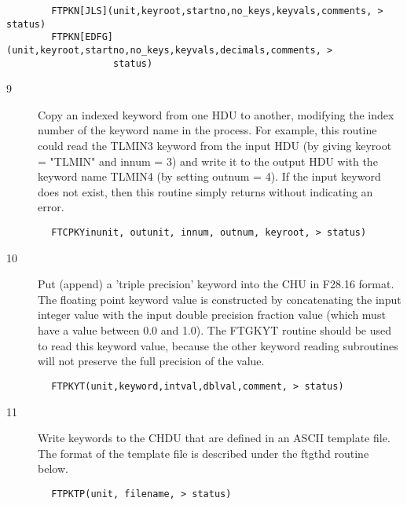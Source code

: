 \documentclass[11pt]{book}
\begin{document}
\begin{verbatim}
        FTPKN[JLS](unit,keyroot,startno,no_keys,keyvals,comments, > status)
        FTPKN[EDFG](unit,keyroot,startno,no_keys,keyvals,decimals,comments, >
                   status)
\end{verbatim}

\begin{description}
\item[9 ]Copy an indexed keyword from one HDU to another, modifying
    the index number of the keyword name in the process.  For example,
    this routine could read the TLMIN3 keyword from the input HDU
    (by giving keyroot = "TLMIN" and innum = 3) and write it to the
    output HDU with the keyword name TLMIN4 (by setting outnum = 4).
    If the input keyword does not exist, then this routine simply
   returns without indicating an error.
\end{description}

\begin{verbatim}
        FTCPKYinunit, outunit, innum, outnum, keyroot, > status)
\end{verbatim}

\begin{description}
\item[10] Put (append) a 'triple precision' keyword into the CHU in F28.16 format.
    The floating point keyword value is constructed by concatenating the
    input integer value with the input double precision fraction value
    (which must have a value between 0.0 and 1.0). The FTGKYT routine should
    be used to read this keyword value, because the other keyword reading
   subroutines will not preserve the full precision of the value.
\end{description}

\begin{verbatim}
        FTPKYT(unit,keyword,intval,dblval,comment, > status)
\end{verbatim}

\begin{description}
\item[11] Write keywords to the CHDU that are defined in an ASCII template file.
   The format of the template file is described under the ftgthd
  routine below.
\end{description}

\begin{verbatim}
        FTPKTP(unit, filename, > status)
\end{verbatim}
\end{document}
